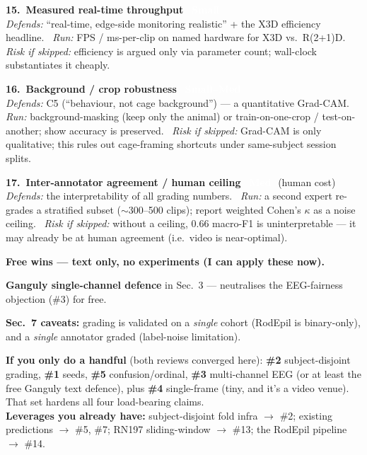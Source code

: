 \documentclass[11pt]{article}
\newcommand{\eff}[2]{\,\colorbox{#1}{\textcolor{white}{\scriptsize\bfseries\,#2\,}}}
\newcommand{\effS}{\eff{effS}{Small}}
\newcommand{\effM}{\eff{effM}{Med}}
\newcommand{\effSM}{\eff{effM}{Small--Med}}
\newcommand{\tier}[2]{%
  \vspace{6pt}\par\noindent{\color{#1}\rule{\linewidth}{2.2pt}}\par\vspace{1pt}%
  {\large\bfseries\color{#1} #2}\par\vspace{3pt}}
\newcommand{\dfd}[1]{{\itshape Defends:} #1.\ }
\newcommand{\run}[1]{{\itshape Run:} #1.\ }
\newcommand{\rsk}[1]{{\itshape Risk if skipped:} #1.}
\begin{document}
\begin{checks}
  \item \textbf{15.\ Measured real-time throughput}\ \effS\\
  \dfd{``real-time, edge-side monitoring realistic'' + the X3D efficiency headline}
  \run{FPS / ms-per-clip on named hardware for X3D vs.\ R(2+1)D}
  \rsk{efficiency is argued only via parameter count; wall-clock substantiates it cheaply}

  \item \textbf{16.\ Background / crop robustness}\ \effSM\\
  \dfd{C5 (``behaviour, not cage background'') --- a quantitative Grad-CAM}
  \run{background-masking (keep only the animal) or train-on-one-crop / test-on-another; show accuracy is preserved}
  \rsk{Grad-CAM is only qualitative; this rules out cage-framing shortcuts under same-subject session splits}

  \item \textbf{17.\ Inter-annotator agreement / human ceiling}\ \effM\ {\small(human cost)}\\
  \dfd{the interpretability of all grading numbers}
  \run{a second expert re-grades a stratified subset ($\sim$300--500 clips); report weighted Cohen's $\kappa$ as a noise ceiling}
  \rsk{without a ceiling, 0.66 macro-F1 is uninterpretable --- it may already be at human agreement (i.e.\ video is near-optimal)}
\end{checks}

\tier{t3}{Free wins --- text only, no experiments (I can apply these now).}
\begin{checks}
  \item \textbf{Ganguly single-channel defence} in Sec.~3 --- neutralises the EEG-fairness objection (\#3) for free.
  \item \textbf{Sec.~7 caveats:} grading is validated on a \emph{single} cohort (RodEpil is binary-only), and a \emph{single} annotator graded (label-noise limitation).
\end{checks}

\vspace{4pt}
\colorbox{boxbg}{\parbox{\dimexpr\linewidth-2\fboxsep}{%
\textbf{If you only do a handful} (both reviews converged here): \textbf{\#2} subject-disjoint grading, \textbf{\#1} seeds, \textbf{\#5} confusion/ordinal, \textbf{\#3} multi-channel EEG (or at least the free Ganguly text defence), plus \textbf{\#4} single-frame (tiny, and it's a video venue). That set hardens all four load-bearing claims.\\[3pt]
\textbf{Leverages you already have:} subject-disjoint fold infra $\to$ \#2; existing predictions $\to$ \#5, \#7; RN197 sliding-window $\to$ \#13; the RodEpil pipeline $\to$ \#14.}}
\end{document}
